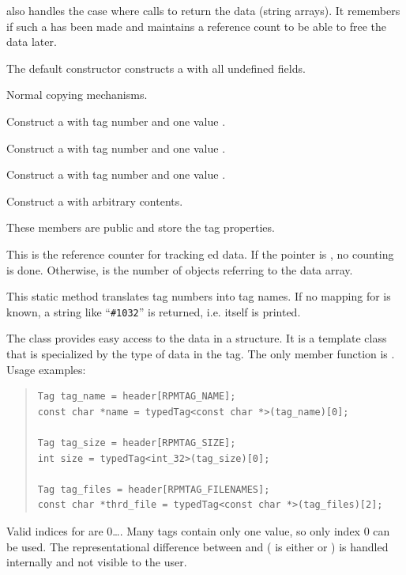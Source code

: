 \documentclass[10pt]{article}
\begin{document}
 also handles the case where  calls
 to return the data (string arrays). It remembers if such
a  has been made and maintains a reference count to be
able to free the data later.

The default constructor constructs a  with all undefined fields.

Normal copying mechanisms.

Construct a  with tag number  and one
 value .

Construct a  with tag number  and one
 value .

Construct a  with tag number  and one
 value .

Construct a  with arbitrary contents.

These members are public and store the tag properties.

This is the reference counter for tracking ed data. If
the pointer is , no counting is done. Otherwise,
 is the number of  objects referring to the
data array.

This static method translates tag numbers into tag names. If no
mapping for  is known, a string like ``\texttt{\#1032}'' is
returned, i.e.  itself is printed.



The  class provides easy access to the data in a
 structure. It is a template class that is specialized by
the type of data in the tag. The only member function is
. Usage examples:
\begin{quote}
\begin{verbatim}
Tag tag_name = header[RPMTAG_NAME];
const char *name = typedTag<const char *>(tag_name)[0];

Tag tag_size = header[RPMTAG_SIZE];
int size = typedTag<int_32>(tag_size)[0];

Tag tag_files = header[RPMTAG_FILENAMES];
const char *thrd_file = typedTag<const char *>(tag_files)[2];
\end{verbatim}
\end{quote}
Valid indices for  are 0\dots{}. Many
tags contain only one value, so only index 0 can be used. The
representational difference between  and
 ( is either 
or ) is handled internally and not visible to the
user.
\end{document}

